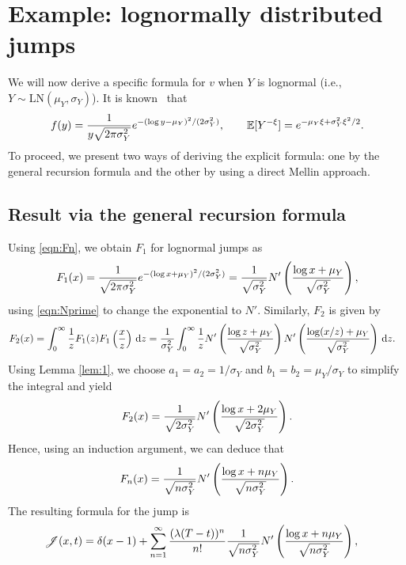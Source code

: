 \section{Example: lognormally distributed jumps}
We will now derive a specific formula for $v$ when $Y$ is lognormal (i.e., $Y \sim \text{LN}(\mu_Y,\sigma_Y)$). It is known~\cite{Merton1976} that
	\begin{equation}
		\label{eqn:LNPDF}
		f(y) = \frac{1}{y\sqrt{2\pi\sigma_Y^2}}e^{-(\log{y} - \mu_Y)^2/(2\sigma_Y^2)}, \qquad \mathbb E[Y^{-\xi}] = e^{-\mu_Y\xi + \sigma_Y^2\xi^2/2}.
	\end{equation}
To proceed, we present two ways of deriving the explicit formula: one by the general recursion formula and the other by using a direct Mellin approach.

\subsection{Result via the general recursion formula}
Using \eqref{eqn:Fn}, we obtain $F_1$ for lognormal jumps as
	\begin{equation*}
		F_1(x) = \frac{1}{\sqrt{2\pi\sigma_Y^2}}e^{-(\log x + \mu_Y)^2/(2\sigma_Y^2)} = \frac{1}{\sqrt{\sigma_Y^2}}N'\left( \frac{\log x + \mu_Y}{\sqrt{\sigma_Y^2}} \right),
	\end{equation*}
using \eqref{eqn:Nprime} to change the exponential to $N'$. Similarly, $F_2$ is given by
	\begin{align*}
		F_2(x) &= \int_0^\infty \frac{1}{z}F_1(z)F_1\left( \frac{x}{z} \right) \, \mathrm d z = \frac{1}{\sigma_Y^2}\int_0^\infty \frac{1}{z} N'\left( \frac{\log z + \mu_Y}{\sqrt{\sigma_Y^2}} \right) N'\left( \frac{\log (x/z) + \mu_Y}{\sqrt{\sigma_Y^2}} \right) \, \mathrm d z.
	\end{align*}
Using Lemma \ref{lem:1}, we choose $a_1 = a_2 = 1/\sigma_Y$ and $b_1 = b_2 = \mu_Y/\sigma_Y$ to simplify the integral and yield
	\begin{equation*}
		F_2(x) = \frac{1}{\sqrt{2\sigma_Y^2}}N'\left( \frac{\log x + 2\mu_Y}{\sqrt{2\sigma_Y^2}} \right).
	\end{equation*}
Hence, using an induction argument, we can deduce that
	\begin{equation*}
		F_n(x) = \frac{1}{\sqrt{n\sigma_Y^2}}N'\left( \frac{\log x + n\mu_Y}{\sqrt{n\sigma_Y^2}} \right).
	\end{equation*}
The resulting formula for the jump is
	\begin{align}
		\label{eqn:jump11}
		\begin{split}
		\mathscr J(x,t) &= \delta(x-1) + \sum\limits_{n=1}^\infty \frac{(\lambda(T-t))^n}{n!}\frac{1}{\sqrt{n\sigma_Y^2}}N'\left( \frac{\log x + n\mu_Y}{\sqrt{n\sigma_Y^2}} \right),
		\end{split}
	\end{align}

